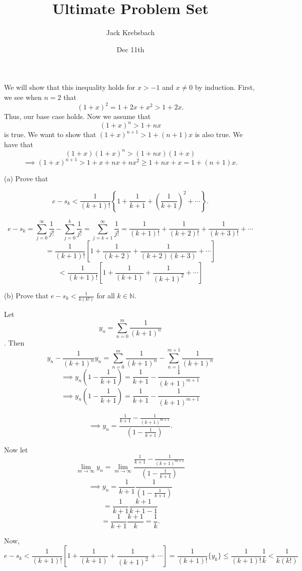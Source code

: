 \documentclass{report}
\title{Ultimate Problem Set}
\author{Jack Krebsbach }
\date{Dec 11th}
\begin{document}
\maketitle




\begin{myproof}
We will show that this inequality holds for $x>-1$ and $x\not= 0$ by induction. First, we see when $n=2$ that $$ (1+x)^2 = 1 +2x + x^2 > 1+2x.$$ Thus, our base case holds. Now we assume that $$ (1+x)^n > 1 +nx$$ is true. We want to show that
$ (1+x)^{n+1} > 1 +(n+1)x$
is also true. We have that $$(1+x)(1+x)^n > (1+nx)(1+x)$$
$$ \implies (1+x)^{n+1} > 1 + x + nx + nx^2 \geq 1 + nx + x = 1 + (n+1)x.$$

\end{myproof}

\pagebreak
{}

(a) Prove that

$$
e-s_k<\frac{1}{(k+1) !}\left\{1+\frac{1}{k+1}+\left(\frac{1}{k+1}\right)^2+\cdots\right\} .
$$

$$ e-s_k = \sum_{j=0}^{\infty} \frac{1}{j !} - \sum_{j=0}^k \frac{1}{j !} = \sum_{j=k+1}^{\infty} \frac{1}{j !} = \frac{1}{(k+1)!} +\frac{1}{(k+2)!}+ \frac{1}{(k+3)!} + \cdots$$ $$= \frac{1}{(k+1)!}\left[1 + \frac{1}{(k+2)}  + \frac{1}{(k+2)(k+3)} + \cdots \right]$$
$$< \frac{1}{(k+1)!}\left[1 + \frac{1}{(k+1)}  + \frac{1}{(k+1)^2} + \cdots \right]$$
\bigskip

\bigskip
(b) Prove that $e-s_k<\frac{1}{k(k!)}$ for all $k \in \mathbb{N}$.

\begin{myproof}
  Let $$ y_n = \sum_{n=0}^{m} \frac{1}{(k+1)^n} $$. Then $$y_n - \frac{1}{(k+1)^n} y_n = \sum_{n=0}^{m} \frac{1}{(k+1)^n} - \sum_{n=1}^{m+1} \frac{1}{(k+1)^n} $$ 
  $$\implies y_n\left(1 - \frac{1}{k+1}\right) = \frac{1}{k+1} - \frac{1}{(k+1)^{m+1}} $$   
  $$\implies y_n\left(1 - \frac{1}{k+1}\right) = \frac{1}{k+1} - \frac{1}{(k+1)^{m+1}} $$

$$\implies y_n = \frac{\frac{1}{k+1} - \frac{1}{(k+1)^{m+1}}}{\left(1 - \frac{1}{k+1}\right)}.$$


Now let $$ \lim_{m \rightarrow \infty} y_n = \lim_{m \rightarrow \infty}\frac{\frac{1}{k+1} - \frac{1}{(k+1)^{m+1}}}{\left(1 - \frac{1}{k+1}\right)}$$
$$ \implies y_n = \frac{1}{k+1}\frac{1}{\left(1 - \frac{1}{k+1}\right)}$$
$$  = \frac{1}{k+1}\frac{k+1}{k+1-1}$$
$$  = \frac{1}{k+1}\frac{k+1}{k} = \frac{1}{k}.$$


Now, $$ e - s_k  < \frac{1}{(k+1)!}\left[1 + \frac{1}{(k+1)}  + \frac{1}{(k+1)^2} + \cdots \right] = \frac{1}{(k+1)!}\{y_k\} \leq \frac{1}{(k+1)!} \frac{1}{k} < \frac{1}{k(k!)}$$
\end{myproof}
\end{document}
